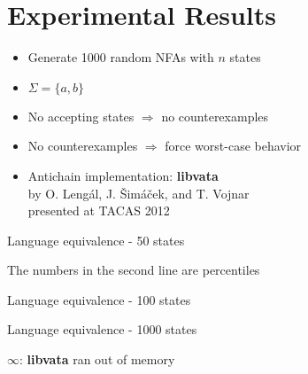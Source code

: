 \documentclass[compress]{beamer}
\begin{document}
\section{Experimental Results}

\begin{frame}
  \begin{itemize}
    \item Generate 1000 random NFAs with $n$ states
    \item $\Sigma = \{a, b\}$
    \item No accepting states $\Rightarrow$ no counterexamples
    \item No counterexamples $\Rightarrow$ force worst-case behavior
    \item Antichain implementation: \textbf{libvata}\\
            by O. Leng{\'a}l, J. {\v{S}}im{\'a}{\v{c}}ek, and T. Vojnar\\
            presented at TACAS 2012
  \end{itemize}
\end{frame}

\begin{frame}{Language equivalence - 50 states}
  \begin{figure}

    \vspace*{0.4cm}
    

  \end{figure}

    The numbers in the second line are percentiles
\end{frame}

\begin{frame}{Language equivalence - 100 states}
  \begin{figure}

    \vspace*{0.05cm}
    

  \end{figure}

\end{frame}

\begin{frame}{Language equivalence - 1000 states}
  \begin{figure}

    \vspace*{0.57cm}
    

  \end{figure}

    $\infty$: \textbf{libvata} ran out of memory
\end{frame}
\end{document}

